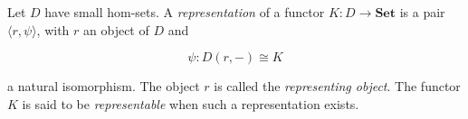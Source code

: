 Let $D$ have small hom-sets. A \emph{representation} of a functor $K: D \to \mathbf{Set}$ is a pair $\langle r, \psi \rangle$, with $r$ an object of $D$ and

\[
\psi: D(r, -) \cong K
\]

a natural isomorphism. The object $r$ is called the \emph{representing object}. The functor $K$ is said to be \emph{representable} when such a representation exists.
